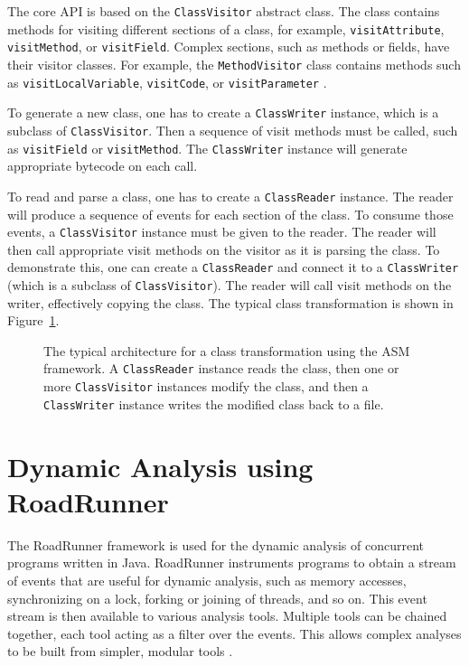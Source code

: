 The core API is based on the \texttt{ClassVisitor} abstract class. The class
contains methods for visiting different sections of a class, for example,
\texttt{visitAttribute}, \texttt{visitMethod}, or \texttt{visitField}. Complex
sections, such as methods or fields, have their visitor classes. For example,
the \texttt{MethodVisitor} class contains methods such as
\texttt{visitLocalVariable}, \texttt{visitCode}, or \texttt{visitParameter}
\cite{asmguide}.

To generate a new class, one has to create a \texttt{ClassWriter} instance,
which is a subclass of \texttt{ClassVisitor}. Then a sequence of visit methods
must be called, such as \texttt{visitField} or \texttt{visitMethod}. The
\texttt{ClassWriter} instance will generate appropriate bytecode on each call.

To read and parse a class, one has to create a \texttt{ClassReader} instance.
The reader will produce a sequence of events for each section of the class. To
consume those events, a \texttt{ClassVisitor} instance must be given to the
reader. The reader will then call appropriate visit methods on the visitor as it
is parsing the class. To demonstrate this, one can create a \texttt{ClassReader}
and connect it to a \texttt{ClassWriter} (which is a subclass of
\texttt{ClassVisitor}). The reader will call visit methods on the writer,
effectively copying the class. The typical class transformation is shown in
Figure~\ref{asmArchitecture}.


\begin{figure}[hbt]
    \label{asmArchitecture}
    
    \caption{The typical architecture for a class transformation using the ASM
    framework. A \texttt{ClassReader} instance reads the class, then one or more
    \texttt{ClassVisitor} instances modify the class, and then a
    \texttt{ClassWriter} instance writes the modified class back to a file.}
\end{figure}

\section{Dynamic Analysis using RoadRunner}
\label{roadRunnerUsage}

The RoadRunner framework is used for the dynamic analysis of concurrent programs
written in Java. RoadRunner instruments programs to obtain a stream of events
that are useful for dynamic analysis, such as memory accesses, synchronizing on
a lock, forking or joining of threads, and so on. This event stream is then
available to various analysis tools. Multiple tools can be chained together,
each tool acting as a filter over the events. This allows complex analyses to be
built from simpler, modular tools \cite{RoadRunner}.

